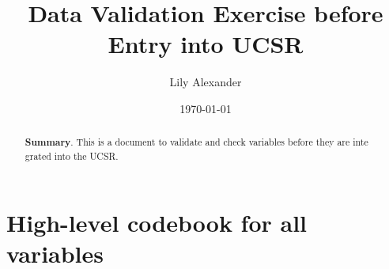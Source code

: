\documentclass{article}
\begin{document}
\title{Data Validation Exercise before Entry into UCSR}\author{
Lily Alexander
}

\date{
\bigskip
\today
}

\maketitle

\begin{abstract}
\textbf{Summary}. This is a document to validate and check variables before they are inte
grated into the UCSR.
\end{abstract}

\section{High-level codebook for all variables}
\end{document}
